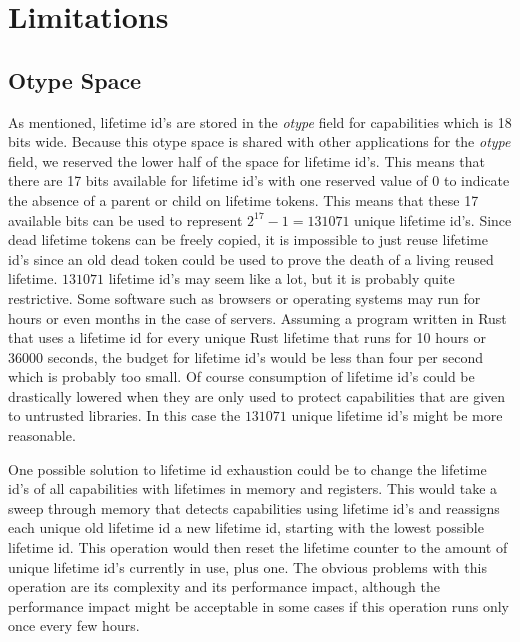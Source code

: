 \section{Limitations}
\subsection{Otype Space}
As mentioned, lifetime id's are stored in the \textit{otype} field for capabilities which is 18 bits wide.
Because this otype space is shared with other applications for the \textit{otype} field, we reserved the lower half of the space for lifetime id's.
This means that there are 17 bits available for lifetime id's with one reserved value of 0 to indicate the absence of a parent or child on lifetime tokens.
This means that these 17 available bits can be used to represent $2^{17} - 1 = 131071$ unique lifetime id's.
Since dead lifetime tokens can be freely copied, it is impossible to just reuse lifetime id's since an old dead token could be used to prove the death of a living reused lifetime.
$131071$ lifetime id's may seem like a lot, but it is probably quite restrictive.
Some software such as browsers or operating systems may run for hours or even months in the case of servers.
Assuming a program written in Rust that uses a lifetime id for every unique Rust lifetime that runs for 10 hours or 36000 seconds, the budget for lifetime id's would be less than four per second which is probably too small.
Of course consumption of lifetime id's could be drastically lowered when they are only used to protect capabilities that are given to untrusted libraries.
In this case the $131071$ unique lifetime id's might be more reasonable.

One possible solution to lifetime id exhaustion could be to change the lifetime id's of all capabilities with lifetimes in memory and registers.
This would take a sweep through memory that detects capabilities using lifetime id's and reassigns each unique old lifetime id a new lifetime id, starting with the lowest possible lifetime id.
This operation would then reset the lifetime counter to the amount of unique lifetime id's currently in use, plus one.
The obvious problems with this operation are its complexity and its performance impact, although the performance impact might be acceptable in some cases if this operation runs only once every few hours.


